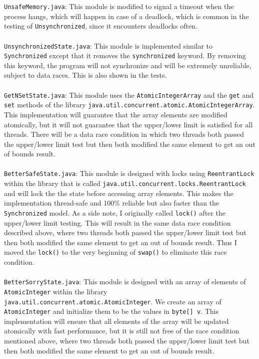 \documentclass[10pt]{article}
\begin{document}
\texttt{UnsafeMemory.java}: This module is modified to signal a timeout when the process hangs, which will happen in case of a deadlock, which is common in the testing of \texttt{Unsynchronized}, since it encounters deadlocks often. \\ \\
\texttt{UnsynchronizedState.java}: This module is implemented similar to \texttt{Synchronized} except that it removes the \texttt{synchronized} keyword. By removing this keyword, the program will not synchronize and will be extremely unreliable, subject to data races. This is also shown in the tests. \\ \\
\texttt{GetNSetState.java}: This module uses the \texttt{AtomicIntegerArray} and the \texttt{get} and \texttt{set} methods of the library \texttt{java.util.concurrent.atomic.AtomicIntegerArray}. This implementation will guarantee that the array elements are modified atomically, but it will not guarantee that the upper/lower limit is satisfied for all threads. There will be a data race condition in which two threads both passed the upper/lower limit test but then both modified the same element to get an out of bounds result. \\ \\
\texttt{BetterSafeState.java}: This module is designed with locks using \texttt{ReentrantLock} within the library that is called \texttt{java.util.concurrent.locks.ReentrantLock} and will lock the the state before accessing array elements. This makes the implementation thread-safe and 100\% reliable but also faster than the \texttt{Synchronized} model. As a side note, I originally called \texttt{lock()} after the upper/lower limit testing. This will result in the same data race condition described above, where two threads both passed the upper/lower limit test but then both modified the same element to get an out of bounds result. Thus I moved the \texttt{lock()} to the very beginning of \texttt{swap()} to eliminate this race condition. \\ \\
\texttt{BetterSorryState.java}: This module is designed with an array of elements of \texttt{AtomicInteger} within the library \texttt{java.util.concurrent.atomic.AtomicInteger}. We create an array of \texttt{AtomicInteger} and initialize them to be the values in \texttt{byte[] v}. This implementation will ensure that all elements of the array will be updated atomically with fast performance, but it is still not free of the race condition mentioned above, where two threads both passed the upper/lower limit test but then both modified the same element to get an out of bounds result.
\end{document}
